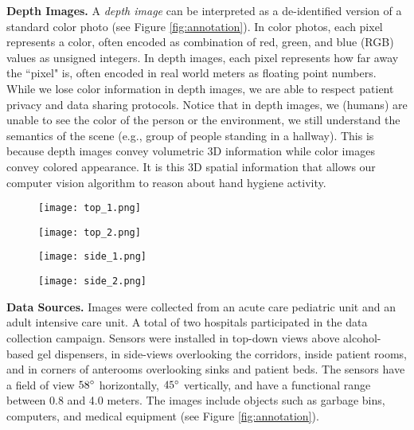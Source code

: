 \documentclass[twoside,11pt]{article}
\begin{document}
\textbf{Depth Images.}
A \textit{depth image} can be interpreted as a de-identified version of a standard color photo (see Figure \ref{fig:annotation}).
In color photos, each pixel represents a color, often encoded as combination of red, green, and blue (RGB) values as unsigned integers.
In depth images, each pixel represents how far away the ``pixel" is, often encoded in real world meters as floating point numbers.
While we lose color information in depth images, we are able to respect patient privacy and data sharing protocols.
Notice that in depth images, we (humans) are unable to see the color of the person or the environment, we still understand the semantics of the scene (e.g., group of people standing in a hallway).
This is because depth images convey volumetric 3D information while color images convey colored appearance.
It is this 3D spatial information that allows our computer vision algorithm to reason about hand hygiene activity.

\begin{figure*}[t]
	\centering
	\begin{subfigure}[t]{0.25\textwidth}
		\texttt{[image: top\_1.png]}
	\end{subfigure}%
	\begin{subfigure}[t]{0.245\textwidth}
		\centering
		\texttt{[image: top\_2.png]}
	\end{subfigure}
	\begin{subfigure}[t]{0.245\textwidth}
		\centering
		\texttt{[image: side\_1.png]}
	\end{subfigure}
	\begin{subfigure}[t]{0.245\textwidth}
		\centering
		\texttt{[image: side\_2.png]}
	\end{subfigure}
	\caption{Example depth images with human annotations. White dots represent different people. Green dots or ``W" denote people performing handwashing events. Red ``IN" denotes a person entering a room. The green box denotes a binary classification label.}
	\label{fig:annotation}
\end{figure*}

\textbf{Data Sources.} Images were collected from an acute care pediatric unit and an adult intensive care unit. A total of two hospitals participated in the data collection campaign.
Sensors were installed in top-down views above alcohol-based gel dispensers, in side-views overlooking the corridors, inside patient rooms, and in corners of anterooms overlooking sinks and patient beds.
The sensors have a field of view $58\degree$ horizontally, $45\degree$ vertically, and have a functional range between 0.8 and 4.0 meters. 
The images include objects such as garbage bins, computers, and medical equipment (see Figure \ref{fig:annotation}).
\end{document}
